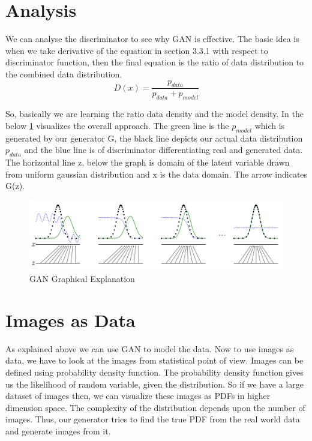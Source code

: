\section{Analysis}

We can analyse the discriminator to see why GAN is effective. The basic idea is when we take derivative of the equation in section 3.3.1 with respect to discriminator function, then the final equation is the ratio of data distribution to the combined data distribution.
$$ D(x) =\frac{p_{data}}{p_{data} + p_{model}}$$

So, basically we are learning the ratio data density and the model density. In the below \cref{fig: GAN Graphical Explanation} visualizes the overall approach. The green  line is the $p_{model}$ which is generated by our generator G, the black line depicts our actual data distribution $p_{data}$ and the blue line is of discriminator differentiating real and generated data. The horizontal line z, below the graph is domain of the latent variable drawn from uniform gaussian %
distribution and x is the data domain. The arrow indicates G(z). 
\begin{figure}[H]
  \centering
    \includegraphics[scale=.4, angle=0]{Files/GAN-Visualize.png}
    \caption[GAN Algorithm Visualization]{ GAN Graphical Explanation\cite{Gan-overview}}
    \label{fig: GAN Graphical Explanation}
\end{figure}

\section{Images as Data}

As explained above we can use GAN to model the data. Now to use images as data, we have to look at the images from statistical point of view.  Images can be defined using probability density function. The probability density function gives us the likelihood of random variable, given the distribution. So if we have a large dataset of images then, we can visualize these images as PDFs in higher dimension space.
The complexity of the distribution depends upon the number of images. Thus, our generator tries to find the true PDF from the real world data and generate images from it.
